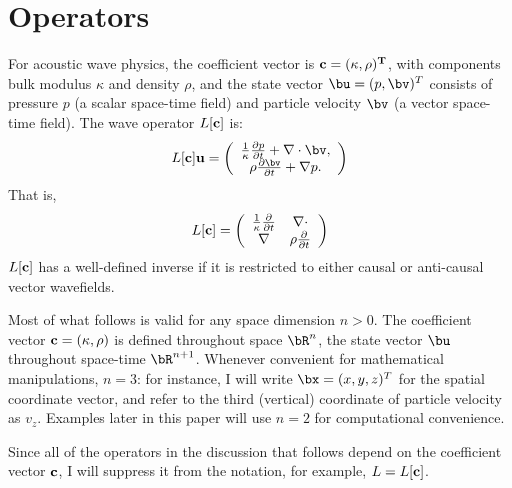 \section{Operators}

For acoustic wave physics, the coefficient vector is
$\bf{c}=(\kappa,\rho)^T$, with components bulk modulus $\kappa$ and
density $\rho$, and the state vector $\bu=(p,\bv)^T$ consists of
pressure $p$ (a scalar space-time field) and particle velocity $\bv$
(a vector space-time field). The wave operator $L[\bf{c}]$ is:
\begin{equation}
\label{eqn:aweop}
L[\bf{c}]\bf{u} = 
\left(
\begin{array}{c}
\frac{1}{\kappa}\frac{\partial p}{\partial t}  + \nabla \cdot \bv, \\
\rho\frac{\partial \bv}{\partial t} + \nabla p.
\end{array}
\right) 
\end{equation}
That is,
\begin{equation}
  \label{eqn:awemat}
  L[{\bf c}] = \left(
    \begin{array}{cc}
      \frac{1}{\kappa}\frac{\partial}{\partial t} & \nabla \cdot \\
      \nabla & \rho \frac{\partial}{\partial t}
    \end{array}
  \right)
\end{equation}
$L[{\bf c}]$ has a well-defined inverse if it is restricted to either
causal or anti-causal vector wavefields.

Most of what follows is valid for any space dimension $n >0$. The
coefficient vector $\bf{c}=(\kappa,\rho)$ is defined throughout space
$\bR^n$, the state vector $\bu$ throughout space-time
$\bR^{n+1}$. Whenever convenient for mathematical manipulations,
$n=3$: for instance, I will write $\bx=(x,y,z)^T$ for the spatial
coordinate vector, and refer to the third (vertical) coordinate of
particle velocity as $v_z$. Examples
later in this paper will use $n=2$ for computational convenience.

Since all of the operators in the discussion that follows depend on
the coefficient vector 
$\bf{c}$, I will suppress it from the notation, for example, $L=L[\bf{c}]$.

